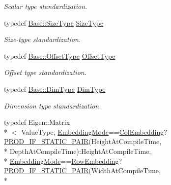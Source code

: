 \begin{DoxyCompactItemize}
\begin{DoxyCompactList}\small\item\em Scalar type standardization. \end{DoxyCompactList}\item 
typedef \hyperlink{classffnn_1_1layer_1_1internal_1_1_interface_af0567642f60c65b5e87067226a54174b}{Base\-::\-Size\-Type} \hyperlink{classffnn_1_1layer_1_1_receptive_volume_a3e9853931ec53fae609bb3fef11fa325}{Size\-Type}
\begin{DoxyCompactList}\small\item\em Size-\/type standardization. \end{DoxyCompactList}\item 
typedef \hyperlink{classffnn_1_1layer_1_1internal_1_1_interface_adc5bb454329ebd51ac26579a43c006fd}{Base\-::\-Offset\-Type} \hyperlink{classffnn_1_1layer_1_1_receptive_volume_a1844c5ef59193938758e778eb0530ba6}{Offset\-Type}
\begin{DoxyCompactList}\small\item\em Offset type standardization. \end{DoxyCompactList}\item 
typedef \hyperlink{classffnn_1_1layer_1_1internal_1_1_interface_a8d121d0103f254b51e48f7b20a17681f}{Base\-::\-Dim\-Type} \hyperlink{classffnn_1_1layer_1_1_receptive_volume_ab0bd7607040aa08bf9cdfcc30e2794ef}{Dim\-Type}
\begin{DoxyCompactList}\small\item\em Dimension type standardization. \end{DoxyCompactList}\item 
typedef Eigen\-::\-Matrix\\*
$<$ Value\-Type, \hyperlink{namespaceffnn_1_1layer_a254f16beba4fb335d935e9b43bb9e69a}{Embedding\-Mode}==\hyperlink{namespaceffnn_1_1layer_a254f16beba4fb335d935e9b43bb9e69aa42ac01b35d45fd60256ef5008c96c049}{Col\-Embedding}?\hyperlink{receptive__volume_8h_a74feffebf310dd34521adc2adcaf64c9}{P\-R\-O\-D\-\_\-\-I\-F\-\_\-\-S\-T\-A\-T\-I\-C\-\_\-\-P\-A\-I\-R}(Height\-At\-Compile\-Time, \\*
Depth\-At\-Compile\-Time)\-:Height\-At\-Compile\-Time, \\*
\hyperlink{namespaceffnn_1_1layer_a254f16beba4fb335d935e9b43bb9e69a}{Embedding\-Mode}==\hyperlink{namespaceffnn_1_1layer_a254f16beba4fb335d935e9b43bb9e69aa91eb0d1f175a08e2b2991cae348c827d}{Row\-Embedding}?\hyperlink{receptive__volume_8h_a74feffebf310dd34521adc2adcaf64c9}{P\-R\-O\-D\-\_\-\-I\-F\-\_\-\-S\-T\-A\-T\-I\-C\-\_\-\-P\-A\-I\-R}(Width\-At\-Compile\-Time, \\*

\end{DoxyCompactItemize}
